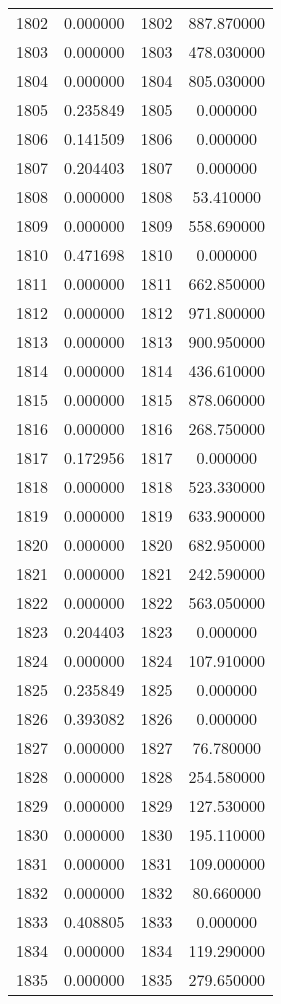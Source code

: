 \documentclass[12pt]{article}
\begin{document}
\begin{longtable}{@{}cccc@{}}
1802 & 0.000000 & 1802 & 887.870000 \\
1803 & 0.000000 & 1803 & 478.030000 \\
1804 & 0.000000 & 1804 & 805.030000 \\
1805 & 0.235849 & 1805 & 0.000000 \\
1806 & 0.141509 & 1806 & 0.000000 \\
1807 & 0.204403 & 1807 & 0.000000 \\
1808 & 0.000000 & 1808 & 53.410000 \\
1809 & 0.000000 & 1809 & 558.690000 \\
1810 & 0.471698 & 1810 & 0.000000 \\
1811 & 0.000000 & 1811 & 662.850000 \\
1812 & 0.000000 & 1812 & 971.800000 \\
1813 & 0.000000 & 1813 & 900.950000 \\
1814 & 0.000000 & 1814 & 436.610000 \\
1815 & 0.000000 & 1815 & 878.060000 \\
1816 & 0.000000 & 1816 & 268.750000 \\
1817 & 0.172956 & 1817 & 0.000000 \\
1818 & 0.000000 & 1818 & 523.330000 \\
1819 & 0.000000 & 1819 & 633.900000 \\
1820 & 0.000000 & 1820 & 682.950000 \\
1821 & 0.000000 & 1821 & 242.590000 \\
1822 & 0.000000 & 1822 & 563.050000 \\
1823 & 0.204403 & 1823 & 0.000000 \\
1824 & 0.000000 & 1824 & 107.910000 \\
1825 & 0.235849 & 1825 & 0.000000 \\
1826 & 0.393082 & 1826 & 0.000000 \\
1827 & 0.000000 & 1827 & 76.780000 \\
1828 & 0.000000 & 1828 & 254.580000 \\
1829 & 0.000000 & 1829 & 127.530000 \\
1830 & 0.000000 & 1830 & 195.110000 \\
1831 & 0.000000 & 1831 & 109.000000 \\
1832 & 0.000000 & 1832 & 80.660000 \\
1833 & 0.408805 & 1833 & 0.000000 \\
1834 & 0.000000 & 1834 & 119.290000 \\
1835 & 0.000000 & 1835 & 279.650000 \\

\end{longtable}
\end{document}
